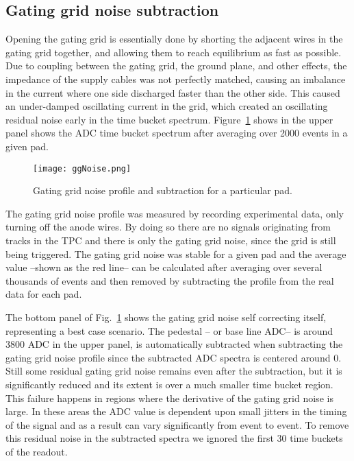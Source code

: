 \subsection{Gating grid noise subtraction}
\label{sec:ggnoisesub}
Opening the gating grid is essentially done by shorting the adjacent wires in the gating grid together, and allowing them to reach equilibrium as fast as possible. Due to coupling between the gating grid, the ground plane, and other effects, the impedance of the supply cables was not perfectly matched, causing an imbalance in the current where one side discharged faster than the other side. This caused an under-damped oscillating current in the grid, which created an oscillating residual noise early in the time bucket spectrum. Figure~\ref{fig:ggNoiseSub} shows in the upper panel shows the ADC time bucket spectrum after averaging over 2000 events in a given pad. 
 
\begin{figure}[!htb]
\centering
\texttt{[image: ggNoise.png]}
\caption{Gating grid noise profile and subtraction for a particular pad.}
\label{fig:ggNoiseSub}
\end{figure}

The gating grid noise profile was measured by recording experimental data, only turning off the anode wires. By doing so there are no signals originating from tracks in the TPC and there is only the gating grid noise, since the grid is still being triggered. The gating grid noise was stable for a given pad and the average value --shown as the red line-- can be calculated after averaging over several thousands of events and then removed by subtracting the profile from the real data for each pad.

The bottom panel of Fig.~\ref{fig:ggNoiseSub} shows the gating grid noise self correcting itself, representing a best case scenario. The pedestal -- or base line ADC-- is around 3800 ADC in the upper panel, is automatically subtracted when subtracting the gating grid noise profile since the subtracted ADC spectra is centered around 0. Still some residual gating grid noise remains even after the subtraction, but it is significantly reduced and its extent is over a much smaller time bucket region. This failure happens in regions where the derivative of the gating grid noise is large. In these areas the ADC value is dependent upon small jitters in the timing of the signal and as a result can vary significantly from event to event. To remove this residual noise in the subtracted spectra we ignored the first 30 time buckets of the readout.

